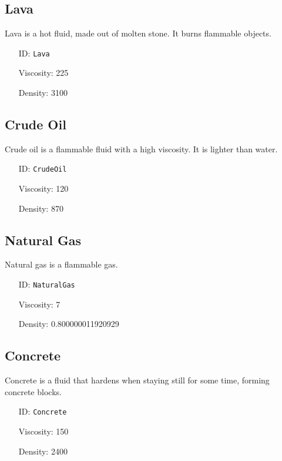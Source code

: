 \subsection{Lava}\label{subsec:fluids_lava}
Lava is a hot fluid, made out of molten stone. It burns flammable objects.
\newline
\begin{itemize}[nosep]
    \item[ID:] \texttt{Lava}
    \item[Viscosity:] 225
    \item[Density:] 3100
\end{itemize}

\subsection{Crude Oil}\label{subsec:fluids_crude oil}
Crude oil is a flammable fluid with a high viscosity. It is lighter than water.
\newline
\begin{itemize}[nosep]
    \item[ID:] \texttt{CrudeOil}
    \item[Viscosity:] 120
    \item[Density:] 870
\end{itemize}

\subsection{Natural Gas}\label{subsec:fluids_natural gas}
Natural gas is a flammable gas.
\newline
\begin{itemize}[nosep]
    \item[ID:] \texttt{NaturalGas}
    \item[Viscosity:] 7
    \item[Density:] 0.800000011920929
\end{itemize}

\subsection{Concrete}\label{subsec:fluids_concrete}
Concrete is a fluid that hardens when staying still for some time, forming concrete blocks.
\newline
\begin{itemize}[nosep]
    \item[ID:] \texttt{Concrete}
    \item[Viscosity:] 150
    \item[Density:] 2400
\end{itemize}

